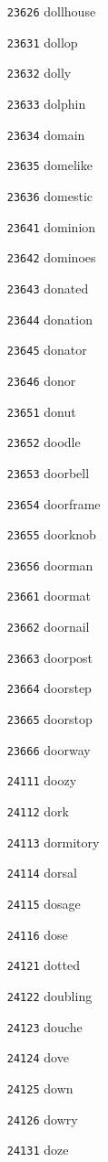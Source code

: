 \documentclass[twoside,11pt]{article}
\begin{document}
\begin{multicols}{5}
\begin{enumerate}
\item[\texttt{23626}] dollhouse
\item[\texttt{23631}] dollop
\item[\texttt{23632}] dolly
\item[\texttt{23633}] dolphin
\item[\texttt{23634}] domain
\item[\texttt{23635}] domelike
\item[\texttt{23636}] domestic
\item[\texttt{23641}] dominion
\item[\texttt{23642}] dominoes
\item[\texttt{23643}] donated
\item[\texttt{23644}] donation
\item[\texttt{23645}] donator
\item[\texttt{23646}] donor
\item[\texttt{23651}] donut
\item[\texttt{23652}] doodle
\item[\texttt{23653}] doorbell
\item[\texttt{23654}] doorframe
\item[\texttt{23655}] doorknob
\item[\texttt{23656}] doorman
\item[\texttt{23661}] doormat
\item[\texttt{23662}] doornail
\item[\texttt{23663}] doorpost
\item[\texttt{23664}] doorstep
\item[\texttt{23665}] doorstop
\item[\texttt{23666}] doorway
\item[\texttt{24111}] doozy
\item[\texttt{24112}] dork
\item[\texttt{24113}] dormitory
\item[\texttt{24114}] dorsal
\item[\texttt{24115}] dosage
\item[\texttt{24116}] dose
\item[\texttt{24121}] dotted
\item[\texttt{24122}] doubling
\item[\texttt{24123}] douche
\item[\texttt{24124}] dove
\item[\texttt{24125}] down
\item[\texttt{24126}] dowry
\item[\texttt{24131}] doze

\end{enumerate}
\end{multicols}
\end{document}
